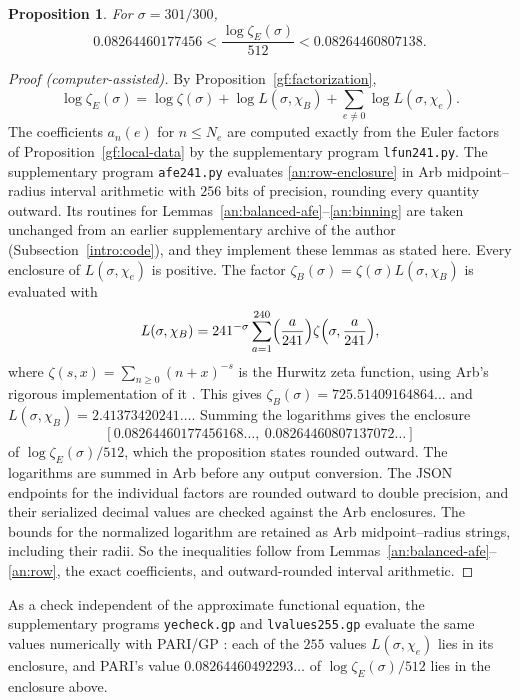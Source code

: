 \documentclass[11pt]{amsart}
\numberwithin{equation}{section}
\newtheorem{proposition}[equation]{Proposition}
\theoremstyle{definition}
\theoremstyle{remark}
\begin{document}
\begin{proposition}\label{an:genus-value}
For $\sigma=301/300$,
\[
 0.08264460177456<\frac{\log\zeta_E(\sigma)}{512}<0.08264460807138.
\]
\end{proposition}

\begin{proof}[Proof (computer-assisted)]
By Proposition~\ref{gf:factorization},
\[
 \log\zeta_E(\sigma)=\log\zeta(\sigma)+\log L(\sigma,\chi_B)
 +\sum_{e\ne0}\log L(\sigma,\chi_e).
\]
The coefficients $a_n(e)$ for $n\le N_e$ are computed exactly from the Euler
factors of Proposition~\ref{gf:local-data} by the supplementary program
\texttt{lfun241.py}. The supplementary program \texttt{afe241.py} evaluates
\eqref{an:row-enclosure} in Arb midpoint--radius interval arithmetic
\cite{Johansson2017,FLINT} with $256$ bits of precision, rounding every
quantity outward. Its routines for
Lemmas~\ref{an:balanced-afe}--\ref{an:binning} are taken unchanged from an
earlier supplementary archive of the author (Subsection~\ref{intro:code}), and
they implement these lemmas as stated here. Every enclosure of
$L(\sigma,\chi_e)$ is positive. The factor
$\zeta_B(\sigma)=\zeta(\sigma)L(\sigma,\chi_B)$ is evaluated with
\[
 L(\sigma,\chi_B)=241^{-\sigma}\sum_{a=1}^{240}\Bigl(\frac
 a{241}\Bigr)\zeta\Bigl(\sigma,\frac a{241}\Bigr),
\]
where $\zeta(s,x)=\sum_{n\ge0}(n+x)^{-s}$ is the Hurwitz zeta function,
using Arb's rigorous implementation of it \cite{Johansson2015Hurwitz}. This
gives $\zeta_B(\sigma)=725.51409164864\ldots$ and
$L(\sigma,\chi_B)=2.41373420241\ldots$. Summing the logarithms gives the
enclosure
\[
 [0.08264460177456168\ldots,\ 0.08264460807137072\ldots]
\]
of $\log\zeta_E(\sigma)/512$, which the proposition states rounded outward.
The logarithms are summed in Arb before any output conversion. The JSON
endpoints for the individual factors are rounded outward to double
precision, and their serialized decimal values are checked against the
Arb enclosures. The bounds for the normalized logarithm are retained as
Arb midpoint--radius strings, including their radii.
So the inequalities follow from
Lemmas~\ref{an:balanced-afe}--\ref{an:row}, the exact coefficients, and
outward-rounded interval arithmetic.
\end{proof}

As a check
independent of the approximate functional equation, the supplementary
programs \texttt{yecheck.gp} and \texttt{lvalues255.gp} evaluate the same
values numerically with PARI/GP \cite{PARI}: each of the $255$ values
$L(\sigma,\chi_e)$ lies in its enclosure, and PARI's value
$0.08264460492293\ldots$ of $\log\zeta_E(\sigma)/512$ lies in the enclosure
above.
\end{document}
